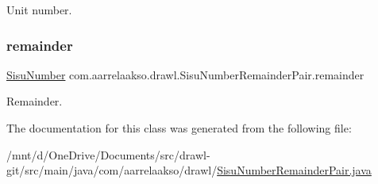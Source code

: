 Unit number. 

\mbox{\label{classcom_1_1aarrelaakso_1_1drawl_1_1_sisu_number_remainder_pair_a2db9bc3ff60d0078b3341f75dd830890}} 
\subsubsection{\texorpdfstring{remainder}{remainder}}
{\footnotesize\ttfamily \hyperlink{classcom_1_1aarrelaakso_1_1drawl_1_1_sisu_number}{Sisu\+Number} com.\+aarrelaakso.\+drawl.\+Sisu\+Number\+Remainder\+Pair.\+remainder\hspace{0.3cm}{\ttfamily [private]}}



Remainder. 



The documentation for this class was generated from the following file\+:\begin{DoxyCompactItemize}
\item 
/mnt/d/\+One\+Drive/\+Documents/src/drawl-\/git/src/main/java/com/aarrelaakso/drawl/\hyperlink{_sisu_number_remainder_pair_8java}{Sisu\+Number\+Remainder\+Pair.\+java}\end{DoxyCompactItemize}
